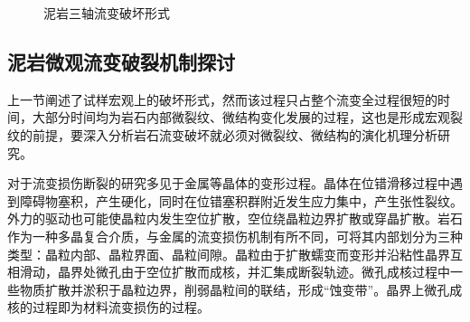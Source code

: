\begin{figure}[ht!]
    \centering
    \caption{泥岩三轴流变破坏形式}
    \label{fig:2-7}
\end{figure}

\subsection{泥岩微观流变破裂机制探讨}

上一节阐述了试样宏观上的破坏形式，然而该过程只占整个流变全过程很短的时间，大部分时间均为岩石内部微裂纹、微结构变化发展的过程，这也是形成宏观裂纹的前提，要深入分析岩石流变破坏就必须对微裂纹、微结构的演化机理分析研究。

对于流变损伤断裂的研究多见于金属等晶体的变形过程。晶体在位错滑移过程中遇到障碍物塞积，产生硬化，同时在位错塞积群附近发生应力集中，产生张性裂纹。外力的驱动也可能使晶粒内发生空位扩散，空位绕晶粒边界扩散或穿晶扩散。岩石作为一种多晶复合介质，与金属的流变损伤机制有所不同，可将其内部划分为三种类型：晶粒内部、晶粒界面、晶粒间隙。晶粒由于扩散蠕变而变形并沿粘性晶界互相滑动，晶界处微孔由于空位扩散而成核，并汇集成断裂轨迹。微孔成核过程中一些物质扩散并淤积于晶粒边界，削弱晶粒间的联结，形成“蚀变带”。晶界上微孔成核的过程即为材料流变损伤的过程。

